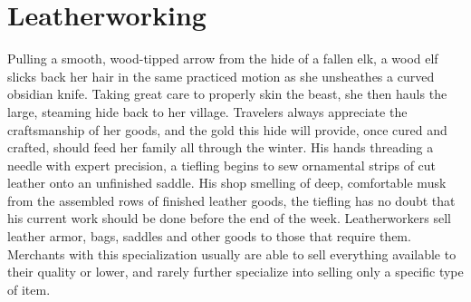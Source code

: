 \documentclass[10pt,a4paper,twoside,twocolumn,openany,nodeprecatedcode,bg=print]{dndbook}
\begin{document}
\section{Leatherworking}
Pulling a smooth, wood-tipped arrow from the hide of a fallen elk, a wood elf slicks back her hair in the same practiced motion as she unsheathes a curved obsidian knife. Taking great care to properly skin the beast, she then hauls the large, steaming hide back to her village. Travelers always appreciate the craftsmanship of her goods, and the gold this hide will provide, once cured and crafted, should feed her family all through the winter.
His hands threading a needle with expert precision, a tiefling begins to sew ornamental strips of cut leather onto an unfinished saddle. His shop smelling of deep, comfortable musk from the assembled rows of finished leather goods, the tiefling has no doubt that his current work should be done before the end of the week.
Leatherworkers sell leather armor, bags, saddles and other goods to those that require them. Merchants with this specialization usually are able to sell everything available to their quality or lower, and rarely further specialize into selling only a specific type of item.
\end{document}

